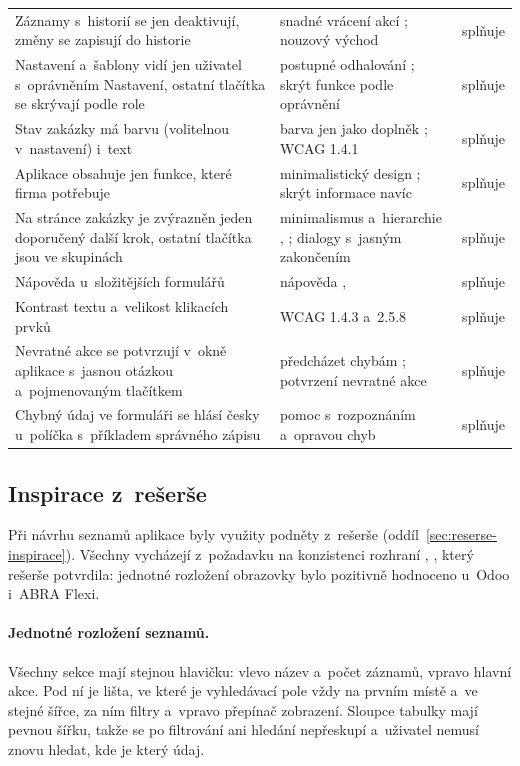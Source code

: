 \begin{longtable}{p{}p{}p{}}
Záznamy s~historií se jen deaktivují, změny se zapisují do historie & snadné vrácení akcí \cite{Shneiderman-pravidla}; nouzový východ \cite[s.~2331]{Sajedi2011} & splňuje \\
Nastavení a~šablony vidí jen uživatel s~oprávněním Nastavení, ostatní tlačítka se skrývají podle role & postupné odhalování \cite{Nielsen-progressive}; skrýt funkce podle oprávnění \cite[s.~2331]{Sajedi2011} & splňuje \\
Stav zakázky má barvu (volitelnou v~nastavení) i~text & barva jen jako doplněk \cite[s.~2329]{Sajedi2011}; WCAG 1.4.1 \cite{WCAG22} & splňuje \\
Aplikace obsahuje jen funkce, které firma potřebuje & minimalistický design \cite{Nielsen-heuristiky}; skrýt informace navíc \cite[s.~2332]{Sajedi2011} & splňuje \\
Na stránce zakázky je zvýrazněn jeden doporučený další krok, ostatní tlačítka jsou ve skupinách & minimalismus a~hierarchie \cite{Nielsen-heuristiky}, \cite{Kaplan2021}; dialogy s~jasným zakončením \cite{Shneiderman-pravidla} & splňuje \\
Nápověda u~složitějších formulářů & nápověda \cite[s.~2330]{Sajedi2011}, \cite{Nielsen-heuristiky} & splňuje \\
Kontrast textu a~velikost klikacích prvků & WCAG 1.4.3 a~2.5.8 \cite{WCAG22} & splňuje \\
Nevratné akce se potvrzují v~okně aplikace s~jasnou otázkou a~pojmenovaným tlačítkem & předcházet chybám \cite{Shneiderman-pravidla}; potvrzení nevratné akce \cite[s.~2331--2332]{Sajedi2011} & splňuje \\
Chybný údaj ve formuláři se hlásí česky u~políčka s~příkladem správného zápisu & pomoc s~rozpoznáním a~opravou chyb \cite{Nielsen-heuristiky} & splňuje \\
\hline
\end{longtable}

\subsection{Inspirace z~rešerše}\label{sec:ui-inspirace}

Při návrhu seznamů aplikace byly využity podněty z~rešerše (oddíl~\ref{sec:reserse-inspirace}). Všechny vycházejí z~požadavku na konzistenci rozhraní \cite{Nielsen-heuristiky}, \cite[s.~2328]{Sajedi2011}, který rešerše potvrdila: jednotné rozložení obrazovky bylo pozitivně hodnoceno u~Odoo i~ABRA Flexi.

\paragraph{Jednotné rozložení seznamů.} Všechny sekce mají stejnou hlavičku: vlevo název a~počet záznamů, vpravo hlavní akce. Pod ní je lišta, ve které je vyhledávací pole vždy na prvním místě a~ve stejné šířce, za ním filtry a~vpravo přepínač zobrazení. Sloupce tabulky mají pevnou šířku, takže se po filtrování ani hledání nepřeskupí a~uživatel nemusí znovu hledat, kde je který údaj.

